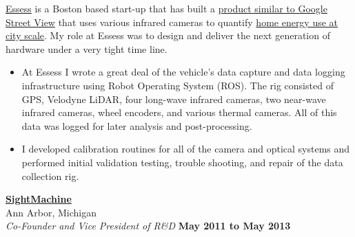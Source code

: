 \documentclass[10pt]{article}
\newenvironment{outerlist}[1][\enskip\textbullet]%
        {\begin{itemize}[#1]}{\end{itemize}%
         \vspace{-.6\baselineskip}}
\newcommand{\blankline}{\quad\pagebreak[2]}
\begin{document}
\blankline
\href{http://www.essess.com/}{Essess} is a Boston based start-up that has built a \href{http://news.mit.edu/2015/startup-essess-heat-mapping-cars-0105}{product similar to Google Street View} that uses various infrared cameras to quantify \href{http://blogs.wsj.com/venturecapital/2014/11/20/heat-mapping-startup-essess-picks-up-10-8-million-to-scan-for-energy-leaks/}{home energy use at city scale}. My role at Essess was to design and deliver the next generation of hardware under a very tight time line. 
\\
\begin{outerlist}
\item At Essess I wrote a great deal of the vehicle's data capture and data logging infrastructure using Robot Operating System (ROS). The rig consisted of GPS, Velodyne LiDAR, four long-wave infrared cameras, two near-wave infrared cameras, wheel encoders, and various thermal cameras. All of this data was logged for later analysis and  post-processing. 
\item I developed calibration routines for all of the camera and optical systems and performed initial validation testing, trouble shooting, and repair of the data collection rig.  
\newline
\end{outerlist}
\blankline
\newline


\href{http://www.sightmachine.com/}{\textbf{SightMachine}} \\
Ann Arbor, Michigan \\
\textit{Co-Founder and Vice President of R\&D}%
        \hfill \textbf{May 2011 to May 2013}  \\
\end{document}
